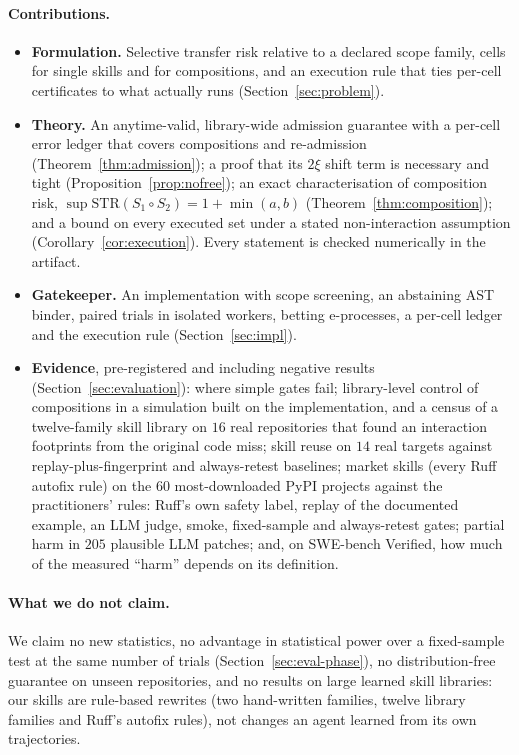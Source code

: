 \paragraph{Contributions.}
\begin{itemize}
\item \textbf{Formulation.}  Selective transfer risk relative to a declared scope family, cells for single skills and for
compositions, and an execution rule that ties per-cell certificates to what actually runs (Section~\ref{sec:problem}).
\item \textbf{Theory.}  An anytime-valid, library-wide admission guarantee with a per-cell error ledger that covers compositions
and re-admission (Theorem~\ref{thm:admission}); a proof that its $2\xi$ shift term is necessary and tight
(Proposition~\ref{prop:nofree}); an exact characterisation of composition risk, $\sup\mathrm{STR}(S_1\circ S_2)=1+\min(a,b)$
(Theorem~\ref{thm:composition}); and a bound on every executed set under a stated non-interaction assumption
(Corollary~\ref{cor:execution}).  Every statement is checked numerically in the artifact.
\item \textbf{Gatekeeper.}  An implementation with scope screening, an abstaining AST binder, paired trials in isolated workers,
betting e-processes, a per-cell ledger and the execution rule (Section~\ref{sec:impl}).
\item \textbf{Evidence}, pre-registered and including negative results (Section~\ref{sec:evaluation}): where simple gates fail;
library-level control of compositions in a simulation built on the implementation, and a census of a twelve-family skill library on
$16$ real repositories that found an interaction footprints from the original code miss; skill reuse on $14$ real targets against
replay-plus-fingerprint and always-retest baselines; market skills (every Ruff autofix rule) on the $60$ most-downloaded PyPI
projects against the practitioners' rules: Ruff's own safety label, replay of the documented example, an LLM judge, smoke,
fixed-sample and always-retest gates; partial harm in $205$ plausible LLM patches; and, on SWE-bench Verified, how
much of the measured ``harm'' depends on its definition.
\end{itemize}

\paragraph{What we do not claim.}  We claim no new statistics, no advantage in statistical power over a fixed-sample test at the same
number of trials (Section~\ref{sec:eval-phase}), no distribution-free guarantee on unseen repositories, and no results on large learned
skill libraries: our skills are rule-based rewrites (two hand-written families, twelve library families and Ruff's autofix rules),
not changes an agent learned from its own trajectories.

